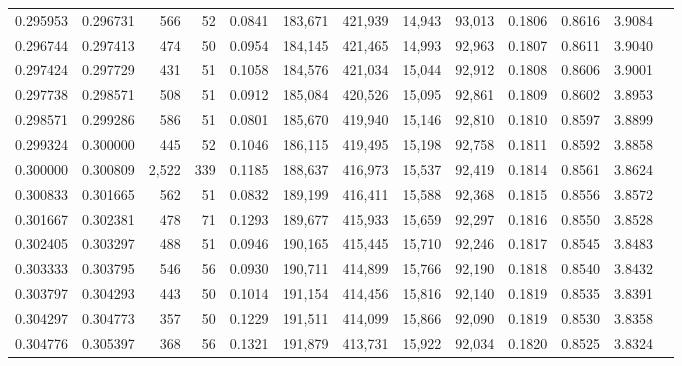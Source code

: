 \begin{tabular}{rrrrrrrrrrrrr}
0.295953 & 0.296731 &    566 &    52 &                                     0.0841 & 183,671 & 421,939 &  14,943 &  93,013 & 0.1806 & 0.8616 & 3.9084 \\
0.296744 & 0.297413 &    474 &    50 &                                     0.0954 & 184,145 & 421,465 &  14,993 &  92,963 & 0.1807 & 0.8611 & 3.9040 \\
0.297424 & 0.297729 &    431 &    51 &                                     0.1058 & 184,576 & 421,034 &  15,044 &  92,912 & 0.1808 & 0.8606 & 3.9001 \\
0.297738 & 0.298571 &    508 &    51 &                                     0.0912 & 185,084 & 420,526 &  15,095 &  92,861 & 0.1809 & 0.8602 & 3.8953 \\
0.298571 & 0.299286 &    586 &    51 &                                     0.0801 & 185,670 & 419,940 &  15,146 &  92,810 & 0.1810 & 0.8597 & 3.8899 \\
0.299324 & 0.300000 &    445 &    52 &                                     0.1046 & 186,115 & 419,495 &  15,198 &  92,758 & 0.1811 & 0.8592 & 3.8858 \\
0.300000 & 0.300809 &  2,522 &   339 &                                     0.1185 & 188,637 & 416,973 &  15,537 &  92,419 & 0.1814 & 0.8561 & 3.8624 \\
0.300833 & 0.301665 &    562 &    51 &                                     0.0832 & 189,199 & 416,411 &  15,588 &  92,368 & 0.1815 & 0.8556 & 3.8572 \\
0.301667 & 0.302381 &    478 &    71 &                                     0.1293 & 189,677 & 415,933 &  15,659 &  92,297 & 0.1816 & 0.8550 & 3.8528 \\
0.302405 & 0.303297 &    488 &    51 &                                     0.0946 & 190,165 & 415,445 &  15,710 &  92,246 & 0.1817 & 0.8545 & 3.8483 \\
0.303333 & 0.303795 &    546 &    56 &                                     0.0930 & 190,711 & 414,899 &  15,766 &  92,190 & 0.1818 & 0.8540 & 3.8432 \\
0.303797 & 0.304293 &    443 &    50 &                                     0.1014 & 191,154 & 414,456 &  15,816 &  92,140 & 0.1819 & 0.8535 & 3.8391 \\
0.304297 & 0.304773 &    357 &    50 &                                     0.1229 & 191,511 & 414,099 &  15,866 &  92,090 & 0.1819 & 0.8530 & 3.8358 \\
0.304776 & 0.305397 &    368 &    56 &                                     0.1321 & 191,879 & 413,731 &  15,922 &  92,034 & 0.1820 & 0.8525 & 3.8324 \\

\end{tabular}
